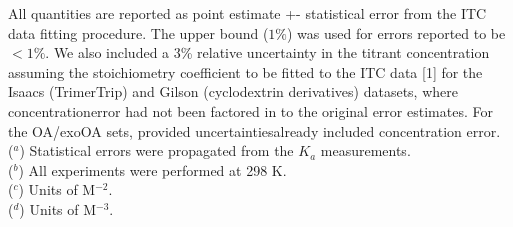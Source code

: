 \documentclass{article}
\begin{document}
All quantities are reported as point estimate +- statistical error from the ITC data fitting procedure. The upper bound ($1\%$) was used for errors reported to be $<1\%$. We also included a 3\% relative uncertainty in the titrant concentration assuming the stoichiometry coefficient to be fitted to the ITC data [1] for the Isaacs (TrimerTrip) and Gilson (cyclodextrin derivatives) datasets, where concentrationerror had not been factored in to the original error estimates. For the OA/exoOA sets, provided uncertaintiesalready included concentration error.\\
($^a$) Statistical errors were propagated from the $K_a$ measurements. \\
($^b$) All experiments were performed at 298 K. \\
($^c$) Units of M$^{-2}$. \\
($^d$) Units of M$^{-3}$.
\end{document}
